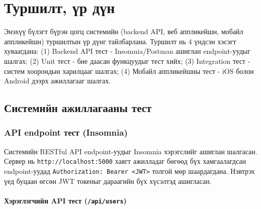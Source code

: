 \chapter{Туршилт, үр дүн}
\label{Chapter4}

Энэхүү бүлэгт бүрэн цогц системийн (backend API, веб аппликейшн, мобайл аппликейшн) туршилтын үр дүнг тайлбарлана. Туршилт нь 4 үндсэн хэсэгт хуваагдана: (1) Backend API тест - Insomnia/Postman ашиглан endpoint-уудыг шалгах; (2) Unit тест - бие даасан функцуудыг тест хийх; (3) Integration тест - систем хоорондын харилцааг шалгах; (4) Мобайл аппликейшны тест - iOS болон Android дээрх ажиллагааг шалгах.

\section{Системийн ажиллагааны тест}
\subsection{API endpoint тест (Insomnia)}

Системийн RESTful API endpoint-уудыг Insomnia хэрэгслийг ашиглан шалгасан. Сервер нь \texttt{http://localhost:5000} хаягт ажилладаг бөгөөд бүх хамгаалагдсан endpoint-уудад \texttt{Authorization: Bearer <JWT>} толгой мөр шаардагдана. Нэвтрэх үед буцаан өгсөн JWT токеныг дараагийн бүх хүсэлтэд ашигласан.

\subsubsection{Хэрэглэгчийн API тест (\texttt{/api/users})}

